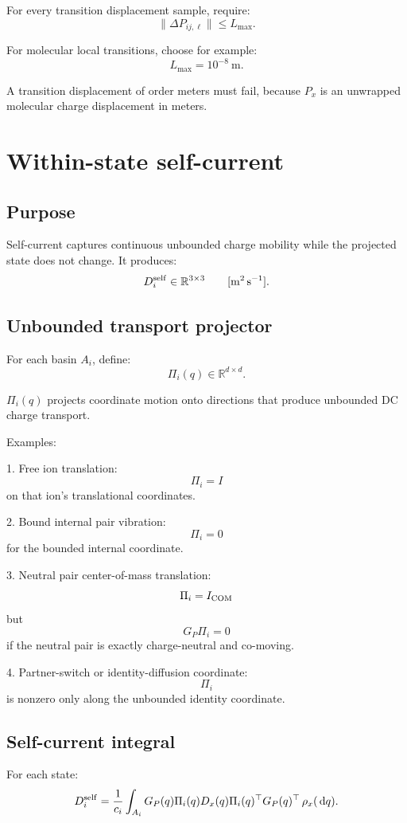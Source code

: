 \documentclass[11pt]{article}
\newcommand{\dd}{\,\mathrm d}
\newcommand{\R}{\mathbb R}
\begin{document}
For every transition displacement sample, require:
\[
\|\Delta P_{ij,\ell}\| \le L_{\max}.
\]

For molecular local transitions, choose for example:
\[
L_{\max}=10^{-8}\ \mathrm{m}.
\]

A transition displacement of order meters must fail, because \(P_x\) is an
unwrapped molecular charge displacement in meters.

\section{Within-state self-current}
\label{sec:selfcurrent}

\subsection{Purpose}

Self-current captures continuous unbounded charge mobility while the projected
state does not change. It produces:
\[
D_i^{\rm self}\in\R^{3\times3}
\qquad [\mathrm{m^2\,s^{-1}}].
\]

\subsection{Unbounded transport projector}

For each basin \(A_i\), define:
\[
\Pi_i(q)\in\R^{d\times d}.
\]

\(\Pi_i(q)\) projects coordinate motion onto directions that produce
unbounded DC charge transport.

Examples:

1. Free ion translation:
\[
\Pi_i=I
\]
on that ion's translational coordinates.

2. Bound internal pair vibration:
\[
\Pi_i=0
\]
for the bounded internal coordinate.

3. Neutral pair center-of-mass translation:
\[
\Pi_i=I_{\rm COM}
\]
but
\[
G_P\Pi_i=0
\]
if the neutral pair is exactly charge-neutral and co-moving.

4. Partner-switch or identity-diffusion coordinate:
\[
\Pi_i
\]
is nonzero only along the unbounded identity coordinate.

\subsection{Self-current integral}

For each state:
\[
D_i^{\rm self}
=
\frac{1}{c_i}
\int_{A_i}
G_P(q)
\Pi_i(q)
D_x(q)
\Pi_i(q)^\top
G_P(q)^\top
\,\rho_x(\dd q).
\]
\end{document}
